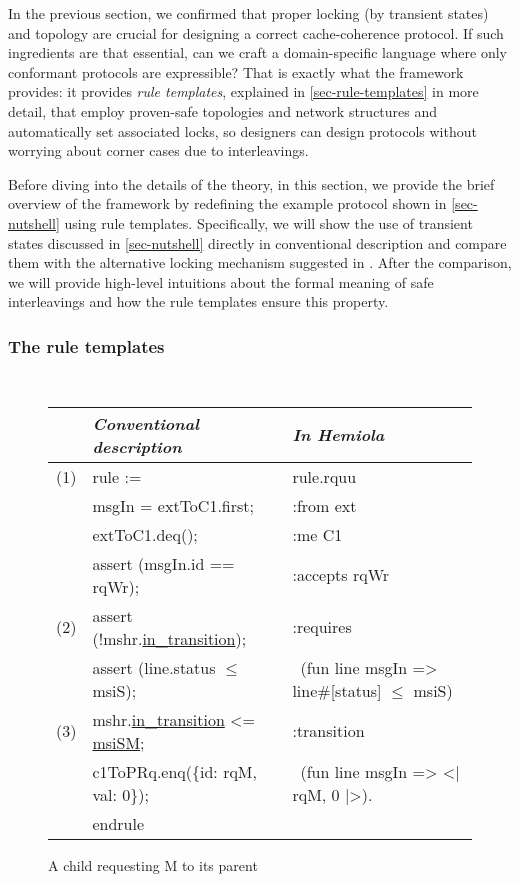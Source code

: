 In the previous section, we confirmed that proper locking (by transient states) and topology are crucial for designing a correct cache-coherence protocol.
If such ingredients are that essential, can we craft a domain-specific language where only conformant protocols are expressible?
That is exactly what the \hemiola{} framework provides: it provides \emph{rule templates}, explained in \autoref{sec-rule-templates} in more detail, that employ proven-safe topologies and network structures and automatically set associated locks, so designers can design protocols without worrying about corner cases due to interleavings.

Before diving into the details of the theory, in this section, we provide the brief overview of the \hemiola{} framework by redefining the example protocol shown in \autoref{sec-nutshell} using rule templates.
Specifically, we will show the use of transient states discussed in \autoref{sec-nutshell} directly in conventional description and compare them with the alternative locking mechanism suggested in \hemiola{}.
After the comparison, we will provide high-level intuitions about the formal meaning of safe interleavings and how the rule templates ensure this property.

\subsubsection{The \hemiola{} rule templates}

\newcommand{\cann}[1]{{\color{mygreen}#1}}
\newcommand{\ccompo}[1]{{\color{myred}#1}}
\newcommand{\ccompt}[1]{{\color{myblue}#1}}
\newcommand{\ccomph}[1]{{\color{mygray}#1}}

\begin{figure}[h]
  \centering\footnotesize\tt\frenchspacing
  \renewcommand{\arraystretch}{1.0}
  \begin{tabular}{|c|l|l|}
    \hline
    & {\sf\it Conventional description} & {\sf\it In Hemiola}\\
    \hline
    (1) & \cann{rule} := & \cann{rule}.rquu\\
    & \ccompo{msgIn} = extToC1.first; & :\cann{from} ext\\
    & extToC1.deq(); & :\cann{me} C1\\
    & \cann{assert} (\ccompo{msgIn}.id == rqWr); & :\cann{accepts} rqWr\\[7pt]
    (2) & \cann{assert} (!\ccomph{mshr}.\underline{in\_transition}); & :\cann{requires}\\
    & \cann{assert} (\ccompt{line}.status $\leq$ msiS); & \ (fun \ccompt{line} \ccompo{msgIn} => \ccompt{line}\#[status] $\leq$ msiS)\\[7pt]
    (3) & \ccomph{mshr}.\underline{in\_transition} <= \underline{msiSM}; & :\cann{transition}\\
    & c1ToPRq.enq(\{id: rqM, val: 0\}); & \ (fun \ccompt{line} \ccompo{msgIn} => <| rqM, 0 |>).\\
    & \cann{endrule} & \\
    \hline
  \end{tabular}
  \caption{A child requesting M to its parent}
  \label{fig-overview-1}
\end{figure}

